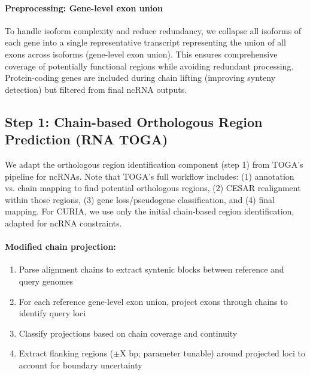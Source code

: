 \documentclass[11pt]{article}
\begin{document}
\paragraph{Preprocessing: Gene-level exon union}
To handle isoform complexity and reduce redundancy, we collapse all isoforms of each gene into a single representative transcript representing the union of all exons across isoforms (gene-level exon union). This ensures comprehensive coverage of potentially functional regions while avoiding redundant processing. Protein-coding genes are included during chain lifting (improving synteny detection) but filtered from final ncRNA outputs.

\subsection{Step 1: Chain-based Orthologous Region Prediction (RNA TOGA)}
We adapt the orthologous region identification component (step 1) from TOGA's pipeline for ncRNAs. Note that TOGA's full workflow includes: (1) annotation vs. chain mapping to find potential orthologous regions, (2) CESAR realignment within those regions, (3) gene loss/pseudogene classification, and (4) final mapping. For CURIA, we use only the initial chain-based region identification, adapted for ncRNA constraints.

\paragraph{Modified chain projection:}
\begin{enumerate}
\item Parse alignment chains to extract syntenic blocks between reference and query genomes
\item For each reference gene-level exon union, project exons through chains to identify query loci
\item Classify projections based on chain coverage and continuity
\item Extract flanking regions ($\pm$X bp; parameter tunable) around projected loci to account for boundary uncertainty
\end{enumerate}
\end{document}
